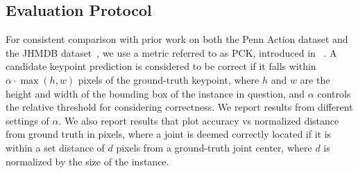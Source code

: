 \documentclass[10pt,twocolumn,letterpaper]{article}
\newcommand{\figref}[1]{Figure~\ref{#1}}
\newcommand{\secref}[1]{Sec.~\ref{#1}}
\newcommand{\refequ}[1]{Eq.~(\ref{#1})}
\newcommand{\reftab}[1]{Table~\ref{#1}}
\newcommand{\note}[3]{{\color{#2}[#1: #3]}}
\newcommand{\OH}[1]{\note{O}{red}{#1}}
\begin{document}
\subsection{Evaluation Protocol}
For consistent comparison with prior work on both the Penn Action dataset and the JHMDB dataset~\cite{gkioxari2016chained,xiaohan2015joint,park2011n}, we use a metric referred to as PCK, introduced in ~\cite{yang2011articulated}. A candidate keypoint prediction is considered to be correct if it falls within $\alpha \cdot \max(h, w)$ pixels of the
ground-truth keypoint, where $h$ and $w$ are the height
and width of the bounding box of the instance in question, and $\alpha$ controls the relative threshold for considering correctness. We report results from different settings of $\alpha$.
We also report results that plot accuracy vs normalized distance from ground truth in pixels, where a joint is deemed correctly located if it is within a set distance
of $d$ pixels from a ground-truth joint center, where $d$ is normalized by the size of the instance.
\end{document}

